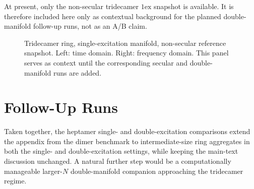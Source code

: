 At present, only the non-secular tridecamer \(1\mathrm{ex}\) snapshot is
available. It is therefore included here only as contextual background for the
planned double-manifold follow-up runs, not as an A/B claim.

\begin{figure}[htbp]
    \centering
    \begin{minipage}[t]{0.49\linewidth}
        \centering
        \safeplaceholdergraphic[1.18\linewidth]{\tridecamerSingleTimePath}
    \end{minipage}\hfill
    \begin{minipage}[t]{0.49\linewidth}
        \centering
        \safeplaceholdergraphic[1.18\linewidth]{\tridecamerSingleFreqPath}
    \end{minipage}
    \caption{Tridecamer ring, single-excitation manifold, non-secular
    reference snapshot. Left: time domain. Right: frequency domain. This panel
    serves as context until the corresponding secular and double-manifold runs
    are added.}
    \label{fig:app_extension_secular_tridecamer_context}
\end{figure}

\section{Follow-Up Runs}
\label{app:sec:extension_secular_followup}

Taken together, the heptamer single- and double-excitation comparisons extend
the appendix from the dimer benchmark to intermediate-size ring aggregates in
both the single- and double-excitation settings, while keeping the main-text
discussion unchanged. A natural further step would be a computationally
manageable larger-\(N\) double-manifold companion approaching the tridecamer
regime.

